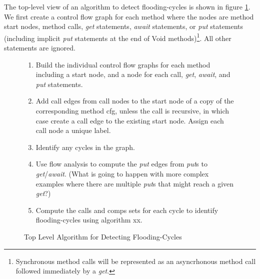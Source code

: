\documentclass[12pt]{article}%
\begin{document}

The top-level view of an algorithm to detect flooding-cycles is shown in figure \ref{flow-analysis}.
We first create a control flow graph for each method where the nodes are method start nodes, method calls, \emph{get} statements, 
\emph{await} statements,
or \emph{put} statements (including implicit \emph{put} statements at the end of Void methods)\footnote{
Synchronous method calls will be represented as an asyncrhonous method call followed immediately by a \emph{get}.}.
All other statements are ignored. 

\begin{figure}
\begin{shaded}
\begin{enumerate}
\item Build the individual control flow graphs for each method including a start node, and a node for each call, \emph{get}, \emph{await}, 
and \emph{put} statements.
\item Add call edges from call nodes to the start node of a copy of the corresponding method cfg, unless the call is recursive, in which case
create a call edge to the existing start node. Assign each call node a unique label.
\item Identify any cycles in the graph.
\item Use flow analysis to compute the \emph{put} edges from \emph{put}s to \emph{get}/\emph{await}. (What is going to happen with more complex examples
where there are multiple \emph{put}s that might reach a given \emph{get}?)
\item Compute the calls and comps sets for each cycle to identify flooding-cycles using algorithm xx.
\end{enumerate}\end{shaded}%
\caption{\label{flow-analysis}
Top Level Algorithm for Detecting Flooding-Cycles}
\end{figure}
\end{document}
